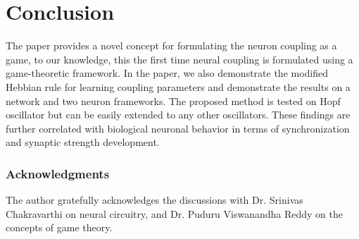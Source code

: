 \documentclass{article}
\begin{document}
\section{Conclusion}
\label{conc}
The paper provides a novel concept for formulating the neuron coupling as a game, to our knowledge, this the first time neural coupling is formulated using a game-theoretic framework. In the paper, we also demonstrate the modified Hebbian rule for learning coupling parameters and demonstrate the results on a network and two neuron frameworks. The proposed method is tested on Hopf oscillator but can be easily extended to any other oscillators. These findings are further correlated with biological neuronal behavior in terms of synchronization and synaptic strength development.  

\subsubsection*{Acknowledgments}

The author gratefully acknowledges the discussions with Dr. Srinivas Chakravarthi on neural circuitry, and Dr. Puduru Viswanandha Reddy on the concepts of game theory.



\end{document}
